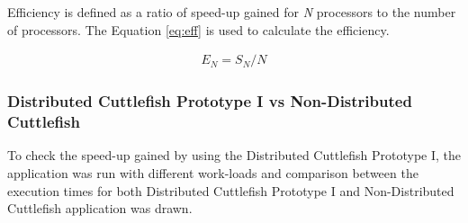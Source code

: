 Efficiency is defined as a ratio of speed-up gained for \textit{N} processors to the number of processors. The Equation \ref{eq:eff} is used to calculate the efficiency.

\begin{equation}
\label{eq:eff}
\begin{aligned}
E_{N} = S_{N}/N
\end{aligned}
\end{equation}

\subsubsection{Distributed Cuttlefish Prototype I vs Non-Distributed Cuttlefish}

To check the speed-up gained by using the Distributed Cuttlefish Prototype I, the application was run with different work-loads and comparison between the execution times for both Distributed Cuttlefish Prototype I and Non-Distributed Cuttlefish application was drawn.

